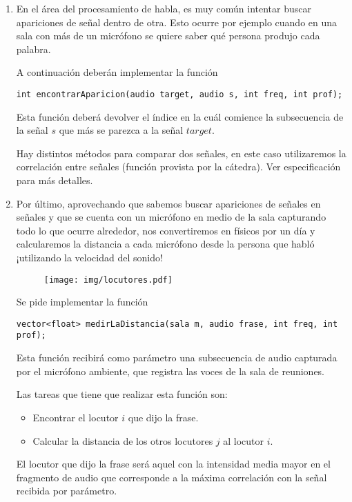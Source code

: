 \documentclass[a4paper]{article}
\begin{document}
\begin{enumerate}
\item En el área del procesamiento de habla, es muy común intentar buscar apariciones de señal dentro de otra. Esto ocurre por ejemplo cuando en una sala con más de un micrófono se quiere saber qué persona produjo cada palabra.

A continuación deberán implementar la función \begin{lstlisting}
int encontrarAparicion(audio target, audio s, int freq,	int prof);
\end{lstlisting}

Esta función deberá devolver el índice en la cuál comience la subsecuencia de la señal $s$ que más se parezca a la señal $target$.

Hay distintos métodos para comparar dos señales, en este caso utilizaremos la correlación entre señales (función provista por la cátedra). Ver especificación para más detalles.



\item Por último, aprovechando que sabemos buscar apariciones de señales en señales y que se cuenta con un micrófono en medio de la sala capturando todo lo que ocurre alrededor, nos convertiremos en físicos por un día y calcularemos la distancia a cada micrófono desde la persona que habló ¡utilizando la velocidad del sonido!

\begin{figure}[h]
\begin{center}
\texttt{[image: img/locutores.pdf]}
\end{center}
\end{figure}

Se pide implementar la función
\begin{lstlisting}
vector<float> medirLaDistancia(sala m, audio frase, int freq, int prof);
\end{lstlisting}
Esta función recibirá como parámetro una subsecuencia de audio capturada por el micrófono ambiente, que registra las voces de la sala de reuniones.

Las tareas que tiene que realizar esta función son:
\begin{itemize}
\item Encontrar el locutor $i$ que dijo la frase.
\item Calcular la distancia de los otros locutores $j$ al locutor $i$.
\end{itemize}




El locutor que dijo la frase será aquel con la intensidad media mayor en el fragmento de audio que corresponde a la máxima correlación con la señal recibida por parámetro.


\end{enumerate}
\end{document}
